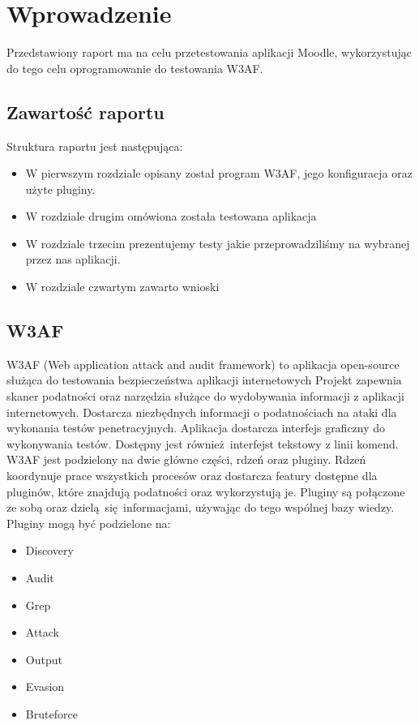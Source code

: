 \chapter{Wprowadzenie}
\label{cha:wprowadzenie}

Przedstawiony raport ma na celu przetestowania aplikacji Moodle, wykorzystując do tego celu oprogramowanie do testowania W3AF.


\section{Zawartość raportu}
\label{sec:zawartoscPracy}
Struktura raportu jest następująca: 
\begin{itemize}
\item W pierwszym rozdziale opisany został program W3AF, jego konfiguracja oraz użyte pluginy. 
\item W rozdziale drugim omówiona została testowana aplikacja 
\item W rozdziale trzecim prezentujemy testy jakie przeprowadziliśmy na wybranej przez nas aplikacji.
\item W rozdziale czwartym zawarto wnioski 
\end{itemize}


\section{W3AF}
W3AF (Web application attack and audit framework) to aplikacja open-source służąca do testowania bezpieczeństwa aplikacji internetowych Projekt zapewnia skaner podatności oraz narzędzia służące do wydobywania informacji z aplikacji internetowych. Dostarcza niezbędnych informacji o podatnościach na ataki dla wykonania testów penetracyjnych. Aplikacja dostarcza interfejs graficzny do wykonywania testów. Dostępny jest również interfejst tekstowy z linii komend.
\\
W3AF jest podzielony na dwie główne części, rdzeń oraz pluginy. Rdzeń koordynuje prace wszystkich procesów oraz dostarcza featury dostępne dla pluginów, które znajdują podatności oraz wykorzystują je. Pluginy są połączone ze sobą oraz dzielą się informacjami, używając do tego wspólnej bazy wiedzy. Pluginy mogą być podzielone na:
\begin{itemize}
\item Discovery
\item Audit
\item Grep
\item Attack
\item Output
\item Evasion
\item Bruteforce
\end{itemize}

